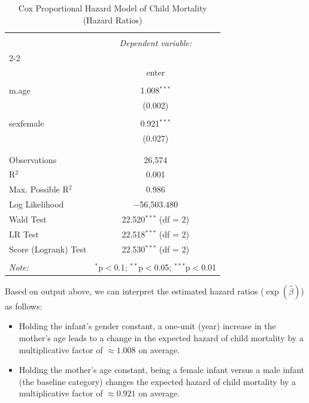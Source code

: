 \documentclass[12pt,letterpaper]{article}
\begin{document}
	\begin{table}[H] \centering 
		\caption{Cox Proportional Hazard Model of Child Mortality (Hazard Ratios)} 
		\label{} 
		\begin{tabular}{@{\extracolsep{5pt}}lc} 
			\\[-1.8ex]\hline 
			\hline \\[-1.8ex] 
			& \multicolumn{1}{c}{\textit{Dependent variable:}} \\ 
			\cline{2-2} 
			\\[-1.8ex] & enter \\ 
			\hline \\[-1.8ex] 
			m.age & 1.008$^{***}$ \\ 
			& (0.002) \\ 
			& \\ 
			sexfemale & 0.921$^{***}$ \\ 
			& (0.027) \\ 
			& \\ 
			\hline \\[-1.8ex] 
			Observations & 26,574 \\ 
			R$^{2}$ & 0.001 \\ 
			Max. Possible R$^{2}$ & 0.986 \\ 
			Log Likelihood & $-$56,503.480 \\ 
			Wald Test & 22.520$^{***}$ (df = 2) \\ 
			LR Test & 22.518$^{***}$ (df = 2) \\ 
			Score (Logrank) Test & 22.530$^{***}$ (df = 2) \\ 
			\hline 
			\hline \\[-1.8ex] 
			\textit{Note:}  & \multicolumn{1}{r}{$^{*}$p$<$0.1; $^{**}$p$<$0.05; $^{***}$p$<$0.01} \\ 
		\end{tabular} 
	\end{table}  
	
	Based on output above, we can interpret the estimated hazard ratios ($\exp(\hat{\beta})$) as follows:
	
	\begin{itemize}
		\item Holding the infant's gender constant, a one-unit (year) increase in the mother's age leads to a change in the expected hazard of child mortality by a multiplicative factor of $\approx 1.008$ on average.
		\item Holding the mother's age constant, being a female infant versus a male infant (the baseline category) changes the expected hazard of child mortality by a multiplicative factor of $\approx 0.921$ on average.
	\end{itemize}
	
\end{document}
